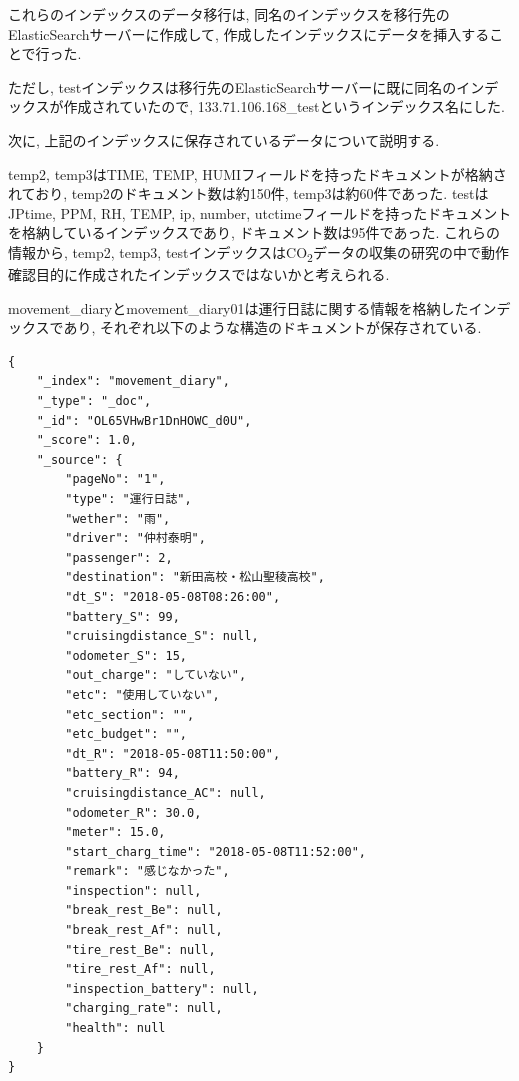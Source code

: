 \documentclass[a4j,12pt,]{jarticle}
\begin{document}
これらのインデックスのデータ移行は, 同名のインデックスを移行先のElasticSearchサーバーに作成して, 作成したインデックスにデータを挿入することで行った.

ただし, testインデックスは移行先のElasticSearchサーバーに既に同名のインデックスが作成されていたので, 133.71.106.168\_testというインデックス名にした.

次に, 上記のインデックスに保存されているデータについて説明する.

temp2, temp3はTIME, TEMP, HUMIフィールドを持ったドキュメントが格納されており, temp2のドキュメント数は約150件, temp3は約60件であった.
testはJPtime, PPM, RH, TEMP, ip, number, utctimeフィールドを持ったドキュメントを格納しているインデックスであり, ドキュメント数は95件であった.
これらの情報から, temp2, temp3, testインデックスはCO\textsubscript{2}データの収集の研究の中で動作確認目的に作成されたインデックスではないかと考えられる.

movement\_diaryとmovement\_diary01は運行日誌に関する情報を格納したインデックスであり, それぞれ以下のような構造のドキュメントが保存されている.

\begin{lstlisting}[caption=movement\_diaryのドキュメントデータ, label=sc1]
  {
    "_index": "movement_diary",
    "_type": "_doc",
    "_id": "OL65VHwBr1DnHOWC_d0U",
    "_score": 1.0,
    "_source": {
        "pageNo": "1",
        "type": "運行日誌",
        "wether": "雨",
        "driver": "仲村泰明",
        "passenger": 2,
        "destination": "新田高校・松山聖稜高校",
        "dt_S": "2018-05-08T08:26:00",
        "battery_S": 99,
        "cruisingdistance_S": null,
        "odometer_S": 15,
        "out_charge": "していない",
        "etc": "使用していない",
        "etc_section": "",
        "etc_budget": "",
        "dt_R": "2018-05-08T11:50:00",
        "battery_R": 94,
        "cruisingdistance_AC": null,
        "odometer_R": 30.0,
        "meter": 15.0,
        "start_charg_time": "2018-05-08T11:52:00",
        "remark": "感じなかった",
        "inspection": null,
        "break_rest_Be": null,
        "break_rest_Af": null,
        "tire_rest_Be": null,
        "tire_rest_Af": null,
        "inspection_battery": null,
        "charging_rate": null,
        "health": null
    }
}
\end{lstlisting}

\end{document}
